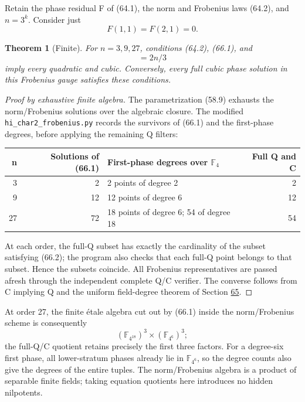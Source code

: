 \documentclass[11pt,reqno]{amsart}
\theoremstyle{plain}
\newtheorem{theorem}{Theorem}[section]
\begin{document}
Retain the phase residual F of (64.1), the norm and Frobenius laws
(64.2), and \(n=3^k\). Consider just
\begin{equation*}
 F(1,1)=F(2,1)=0.
 \tag{66.1}
\end{equation*}

\begin{theorem}[Finite]
For \(n=3,9,27\), conditions (64.2), (66.1),
and
\begin{equation*}
 [\mathbb F_4(W_1):\mathbb F_4]=2n/3
 \tag{66.2}
\end{equation*}
imply every quadratic and cubic. Conversely, every full cubic phase
solution in this Frobenius gauge satisfies these conditions.
\end{theorem}

\begin{proof}[Proof by exhaustive finite algebra]
The parametrization (58.9)
exhausts the norm/Frobenius solutions over the algebraic closure.
The modified \texttt{hi\_\allowbreak char2\_\allowbreak frobenius.py} records the survivors of (66.1)
and the first-phase degrees, before applying the remaining Q filters:

\begin{center}\small
\begin{tabular}{@{}rrlr@{}}
\toprule
n & Solutions of (66.1) & First-phase degrees over \(\mathbb F_4\) & Full Q and C \\
\midrule
3 & 2 & 2 points of degree 2 & 2 \\
9 & 12 & 12 points of degree 6 & 12 \\
27 & 72 & 18 points of degree 6; 54 of degree 18 & 54 \\
\bottomrule
\end{tabular}
\end{center}

At each order, the full-Q subset has exactly the cardinality of the
subset satisfying (66.2); the program also checks that each full-Q
point belongs to that subset. Hence the subsets coincide. All
Frobenius representatives are passed afresh through the independent
complete Q/C verifier. The converse follows from C implying Q and
the uniform field-degree theorem of Section \hyperref[sec:65]{65}.
\end{proof}

At order 27, the finite \'etale algebra cut out by (66.1) inside the
norm/Frobenius scheme is consequently
\[
 (\mathbb F_{4^{18}})^3\times(\mathbb F_{4^6})^3;
\]
the full-Q/C quotient retains precisely the first three factors.
For a degree-six first phase, all lower-stratum phases already lie
in \(\mathbb F_{4^6}\), so the degree counts also give the
degrees of the entire tuples. The norm/Frobenius algebra is a
product of separable finite fields; taking equation quotients here
introduces no hidden nilpotents.
\end{document}
